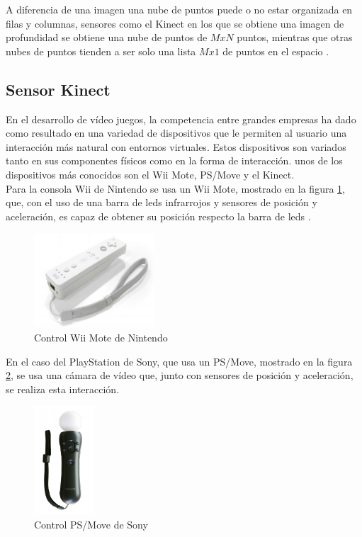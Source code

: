 A diferencia de una \gls{imagen} una nube de puntos puede o no estar organizada en filas y columnas, sensores como el Kinect en los que se obtiene una imagen de profundidad se obtiene una nube de puntos de $MxN$ puntos, mientras que otras nubes de puntos tienden a ser solo una lista $Mx1$ de puntos en el espacio \cite{Rusu_ICRA2011_PCL}.\\


\subsection{Sensor Kinect}

En el desarrollo de vídeo juegos, la competencia entre grandes empresas ha dado como resultado en una variedad de dispositivos que le permiten al usuario una interacción más natural con entornos virtuales. Estos dispositivos son variados tanto en sus componentes físicos como en la forma de interacción. unos de los dispositivos más conocidos son el Wii Mote, PS/Move y el Kinect.\\

Para la consola Wii de Nintendo se usa un Wii Mote, mostrado en la figura \ref{fig:WiiMote}, que, con el uso de una barra de leds infrarrojos y sensores de posición y aceleración, es capaz de obtener su posición respecto la barra de leds \cite{UsodelKi56:online}.\\
\begin{figure}[!htb]
	\centering
	\includegraphics[width=0.4\textwidth]{01Introduccion/imagenes/wiiMote.JPG}
	\caption{Control Wii Mote de Nintendo} 
	\label{fig:WiiMote}
\end{figure}


En el caso del PlayStation de Sony, que usa un PS/Move, mostrado en la figura \ref{fig:psMove}, se usa una cámara de vídeo que, junto con sensores de posición y aceleración, se realiza esta interacción.\\

\begin{figure}[!htb]
	\centering
	\includegraphics[width=0.2\textwidth]{01Introduccion/imagenes/PsMOve.JPG}
	\caption{Control PS/Move de Sony} 
	\label{fig:psMove}
\end{figure}

